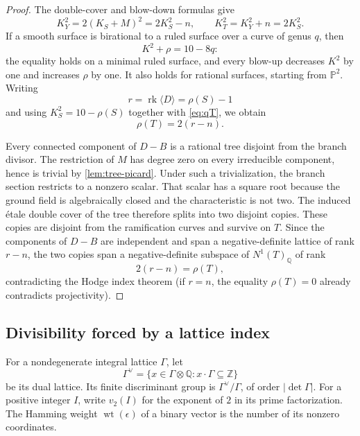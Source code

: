 \documentclass[11pt,reqno]{amsart}
\theoremstyle{definition}
\theoremstyle{remark}
\DeclareMathOperator{\rk}{rk}
\newcommand{\PP}{\mathbb P}
\newcommand{\QQ}{\mathbb Q}
\newcommand{\ZZ}{\mathbb Z}
\numberwithin{equation}{section}
\begin{document}
\begin{proof}
The double-cover and blow-down formulas give
\[
  K_Y^2=2(K_S+M)^2=2K_S^2-n,
  \qquad
  K_T^2=K_Y^2+n=2K_S^2.
\]
If a smooth surface is birational to a ruled surface over a curve of genus $q$, then
\[
  K^2+\rho=10-8q:
\]
the equality holds on a minimal ruled surface, and every blow-up decreases $K^2$ by one and increases $\rho$ by one.  It also holds for rational surfaces, starting from $\PP^2$.  Writing
\[
  r=\rk\langle D\rangle=\rho(S)-1
\]
and using $K_S^2=10-\rho(S)$ together with \eqref{eq:qT}, we obtain
\begin{equation}\label{eq:rhoT}
  \rho(T)=2(r-n).
\end{equation}

Every connected component of $D-B$ is a rational tree disjoint from the branch divisor.  The restriction of $M$ has degree zero on every irreducible component, hence is trivial by \cref{lem:tree-picard}.  Under such a trivialization, the branch section restricts to a nonzero scalar.  That scalar has a square root because the ground field is algebraically closed and the characteristic is not two.  The induced étale double cover of the tree therefore splits into two disjoint copies.  These copies are disjoint from the ramification curves and survive on $T$.  Since the components of $D-B$ are independent and span a negative-definite lattice of rank $r-n$, the two copies span a negative-definite subspace of $N^1(T)_\QQ$ of rank
\[
  2(r-n)=\rho(T),
\]
contradicting the Hodge index theorem (if $r=n$, the equality $\rho(T)=0$ already contradicts projectivity).
\end{proof}

\subsection{Divisibility forced by a lattice index}
For a nondegenerate integral lattice $\Gamma$, let
\[
 \Gamma^\vee=\{x\in\Gamma\otimes\QQ:x\cdot\Gamma\subseteq\ZZ\}
\]
be its dual lattice. Its finite discriminant group is
$\Gamma^\vee/\Gamma$, of order $|\det\Gamma|$. For a positive integer
$I$, write $v_2(I)$ for the exponent of $2$ in its prime factorization.
The Hamming weight $\operatorname{wt}(\epsilon)$ of a binary vector is
the number of its nonzero coordinates.
\end{document}
